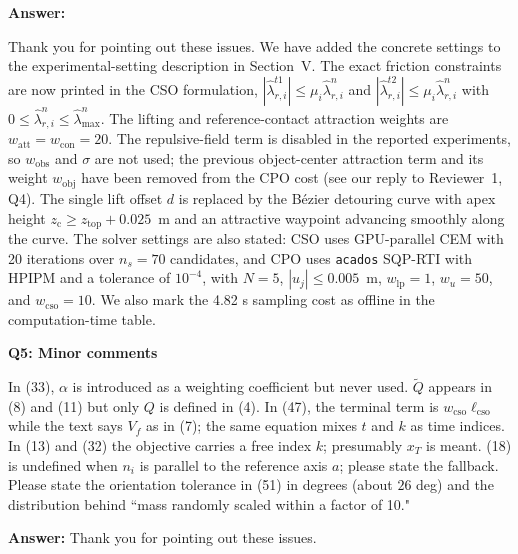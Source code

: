 \documentclass[journal,10pt]{IEEEtran}
\newcommand{\question}[2]{\par\smallskip\noindent
 \color{responseblue}\textbf{Q#1: #2}\par\nobreak\noindent\color{responseblue}}
\newcommand{\answer}{\par\smallskip\noindent\color{black}\textbf{Answer: }\ignorespaces
}
\begin{document}
\answer
Thank you for pointing out these issues. We have added the concrete settings to the experimental-setting description in Section~V. The exact friction constraints are now printed in the CSO formulation, $|\hat{\lambda}_{r,i}^{t1}|\leq\mu_i\hat{\lambda}_{r,i}^{n}$ and $|\hat{\lambda}_{r,i}^{t2}|\leq\mu_i\hat{\lambda}_{r,i}^{n}$ with $0\le\hat{\lambda}^n_{r,i}\le\hat{\lambda}^n_{\max}$. The lifting and reference-contact attraction weights are $w_{\mathrm{att}}=w_{\mathrm{con}}=20$. The repulsive-field term is disabled in the reported experiments, so $w_{\mathrm{obs}}$ and $\sigma$ are not used; the previous object-center attraction term and its weight $w_{\mathrm{obj}}$ have been removed from the CPO cost (see our reply to Reviewer~1, Q4). The single lift offset $d$ is replaced by the B\'ezier detouring curve with apex height $z_{\mathrm{c}}\geq z_{\mathrm{top}}+0.025$~m and an attractive waypoint advancing smoothly along the curve. The solver settings are also stated: CSO uses GPU-parallel CEM with 20 iterations over $n_s=70$ candidates, and CPO uses \texttt{acados} SQP-RTI with HPIPM and a tolerance of $10^{-4}$, with $N=5$, $|u_j|\le0.005$~m, $w_{\mathrm{lp}}=1$, $w_u=50$, and $w_{\mathrm{cso}}=10$. We also mark the 4.82 s sampling cost as offline in the computation-time table.

\question{5}{Minor comments}
In (33), $\alpha$ is introduced as a weighting coefficient but never used.
$\tilde{Q}$ appears in (8) and (11) but only $Q$ is defined in (4).
In (47), the terminal term is $w_{\text{cso}}\ell_{\text{cso}}$ while the text says $V_f$ as
in (7); the same equation mixes $t$ and $k$ as time indices. In (13) and
(32) the objective carries a free index $k$; presumably $x_T$ is meant.
(18) is undefined when $n_i$ is parallel to the reference axis $a$; please
state the fallback.
Please state the orientation tolerance in (51) in degrees (about $26$
deg) and the distribution behind ``mass randomly scaled within a factor
of 10."
\answer Thank you for pointing out these issues. 
\end{document}
